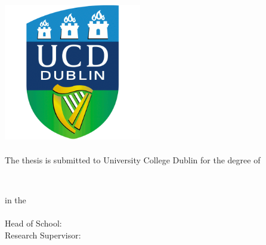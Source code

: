 \begin{titlepage}
	\begin{addmargin}[-1cm]{-3cm}
	\begin{center}
		\large
		\hfill
		\vfill
		\begingroup
			\color{Maroon}\spacedallcaps{\myTitle} \\ \bigskip
		\endgroup
		\spacedlowsmallcaps{\myName}
		\vfill
		\includegraphics[width=6cm]{img/ucd_logo.png} \\ \medskip
		\vfill
		\mySubtitle \\ \medskip
		\vfill
		{T}he thesis is submitted to University College Dublin for the
		degree of \\
		\vfill
		\begin{Large}
		\begin{scshape}
		\textbf{\myDegree }\\
		\end{scshape}
		\end{Large}
		\vfill
		in the \myCollege\\
		\vfill
		\myTime \ 
		\vfill
		\vfill
		\myDepartment \\
		Head of School: \myHeadOfDept \\
		Research Supervisor: \mySupervisor
		\vfill
		\vfill
	\end{center}
	\end{addmargin}
\end{titlepage}
